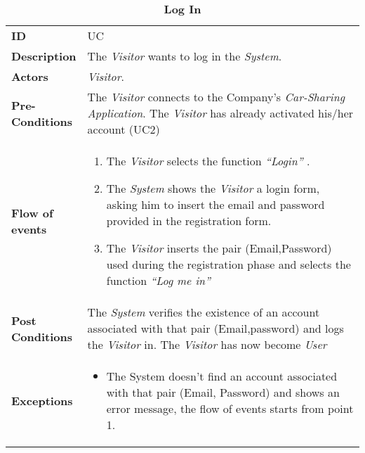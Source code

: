 \begin{longtable}{|p{0.2\linewidth} p{0.8\linewidth}|}
	\captionsetup{labelformat=empty} %
	\caption{\textbf{Log In}} %
	\label{UC_Login}%
	\\ \hline %
	
	\textbf{ID} & UC\theUseCaseIdCounter \\ \hline
	\textbf{Description} & The \emph{Visitor} wants to log in the \emph{System}. \\ \hline
	\textbf{Actors} & \emph{Visitor}.\\ \hline
	\textbf{Pre-Conditions} & The \emph{Visitor} connects to the Company's \emph{Car-Sharing Application}.
	 The \emph{Visitor} has already activated his/her account (UC2) \\ \hline
	\textbf{Flow of events} & 
	\begin{enumerate}
		\item The \emph{Visitor} selects the function \textit{\textquotedblleft{Login}\textquotedblright} .
		\item The \emph{System} shows the \emph{Visitor} a login form, asking him to insert the email and password provided in the registration form.
		\item The \emph{Visitor} inserts the pair (Email,Password) used during the registration phase and selects the function \textit{\textquotedblleft{Log me in}\textquotedblright}
	\end{enumerate}	 \\ \hline
	\textbf{Post Conditions} & The \emph{System} verifies the existence of an account associated with that pair (Email,password) and logs the \emph{Visitor} in. The \emph{Visitor} has now become \emph{User}  \\ \hline
	\textbf{Exceptions} & 
	\begin{itemize}
	\item The System doesn’t find an account associated with that pair (Email, Password) and shows an error message, the flow of events starts from point 1.
	\end{itemize} \\ \hline
\end{longtable}


